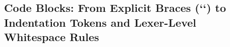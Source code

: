 \subsection{Code Blocks: From Explicit Braces (`{}`) to Indentation Tokens and Lexer-Level Whitespace Rules}
